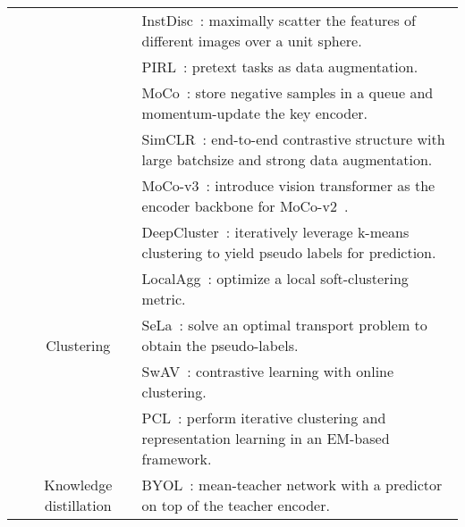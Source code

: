 \documentclass[lettersize,journal]{IEEEtran}
\begin{document}
\begin{table*}
\begin{tabular}{|c|c|l|}
                                                  &                                         & InstDisc~\cite{wu2018unsupervised}: maximally scatter the features of different images over a unit sphere.        \\
                                                  &                                         & PIRL~\cite{misra2020self}: pretext tasks as data augmentation.                                                     \\
                                                  &                                         & MoCo~\cite{he2020momentum}: store negative samples in a queue and momentum-update the key encoder.                \\
                                                  &                                         & SimCLR~\cite{chen2020simple}: end-to-end contrastive structure with large batchsize and strong data augmentation. \\
&                                         & MoCo-v3~\cite{chen2021empirical}: introduce vision transformer as the encoder backbone for MoCo-v2~\cite{chen2020improved}.               \\ \cline{2-3} 
                                                  & \multirow{5}{*}{Clustering}             & DeepCluster~\cite{caron2018deep}: iteratively leverage k-means clustering to yield pseudo labels for prediction.  \\
                                                  &                                         & LocalAgg~\cite{zhuang2019local}: optimize a local soft-clustering metric.                                         \\
                                                  &                                         & SeLa~\cite{asano2019self}: solve an optimal transport problem to obtain the pseudo-labels.                        \\
                                                  &                                         & SwAV~\cite{caron2020unsupervised}: contrastive learning with online clustering.                                   \\
                                                  &                                         & PCL~\cite{li2020prototypical}: perform iterative clustering and representation learning in an EM-based framework. \\ \cline{2-3} 
                                                  & \multirow{5}{*}{Knowledge distillation} & BYOL~\cite{grill2020bootstrap}: mean-teacher network with a predictor on top of the teacher encoder.              \\

\end{tabular}
\end{table*}
\end{document}
